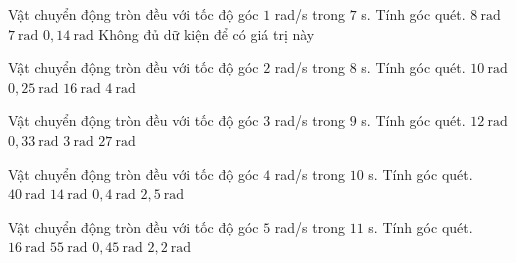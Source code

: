 \begin{ex}
Vật chuyển động tròn đều với tốc độ góc $1$ rad/s trong $7$ s. Tính góc quét.
\choice
{$8\ \mathrm{rad}$}
{\True $7\ \mathrm{rad}$}
{$0,14\ \mathrm{rad}$}
{Không đủ dữ kiện để có giá trị này}
\end{ex}

\begin{ex}
Vật chuyển động tròn đều với tốc độ góc $2$ rad/s trong $8$ s. Tính góc quét.
\choice
{$10\ \mathrm{rad}$}
{$0,25\ \mathrm{rad}$}
{\True $16\ \mathrm{rad}$}
{$4\ \mathrm{rad}$}
\end{ex}

\begin{ex}
Vật chuyển động tròn đều với tốc độ góc $3$ rad/s trong $9$ s. Tính góc quét.
\choice
{$12\ \mathrm{rad}$}
{$0,33\ \mathrm{rad}$}
{$3\ \mathrm{rad}$}
{\True $27\ \mathrm{rad}$}
\end{ex}

\begin{ex}
Vật chuyển động tròn đều với tốc độ góc $4$ rad/s trong $10$ s. Tính góc quét.
\choice
{\True $40\ \mathrm{rad}$}
{$14\ \mathrm{rad}$}
{$0,4\ \mathrm{rad}$}
{$2,5\ \mathrm{rad}$}
\end{ex}

\begin{ex}
Vật chuyển động tròn đều với tốc độ góc $5$ rad/s trong $11$ s. Tính góc quét.
\choice
{$16\ \mathrm{rad}$}
{\True $55\ \mathrm{rad}$}
{$0,45\ \mathrm{rad}$}
{$2,2\ \mathrm{rad}$}
\end{ex}

